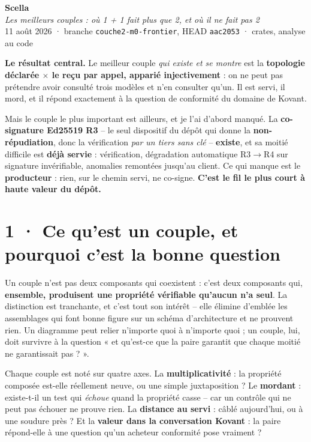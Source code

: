 \documentclass[10pt]{article}
\newcommand{\code}[1]{\texttt{\small #1}}
\newcommand{\x}{$\times$}
\begin{document}
\begin{center}
{\Huge\bfseries\color{navy} Scella}\\[4pt]
{\large\color{grey}\itshape Les meilleurs couples : où 1 + 1 fait plus que 2, et où il ne fait pas 2}\\[4pt]
{\small\color{grey} 11 août 2026 \; · \; branche \code{couche2-m0-frontier}, HEAD \code{aac2053} \; ·  crates, analyse au code}
\end{center}
\vspace{2pt}

\begin{these}
\textbf{Le résultat central.} Le meilleur couple \emph{qui existe et se montre} est la \textbf{topologie
déclarée \x{} le reçu par appel, apparié injectivement} : on ne peut pas prétendre avoir consulté trois
modèles et n'en consulter qu'un. Il est servi, il mord, et il répond exactement à la question de
conformité du domaine de Kovant.

Mais le couple le plus important est ailleurs, et je l'ai d'abord manqué. La \textbf{co-signature
Ed25519 R3} -- le seul dispositif du dépôt qui donne la \textbf{non-répudiation}, donc la vérification
\emph{par un tiers sans clé} -- \textbf{existe}, et sa moitié difficile est \textbf{déjà servie} :
vérification, dégradation automatique R3$\rightarrow$R4 sur signature invérifiable, anomalies
remontées jusqu'au client. Ce qui manque est le \textbf{producteur} : rien, sur le chemin servi, ne
co-signe. \textbf{C'est le fil le plus court à haute valeur du dépôt.}
\end{these}

\section{1 · Ce qu'est un couple, et pourquoi c'est la bonne question}

Un couple n'est pas deux composants qui coexistent : c'est deux composants qui, \textbf{ensemble,
produisent une propriété vérifiable qu'aucun n'a seul}. La distinction est tranchante, et c'est tout
son intérêt -- elle élimine d'emblée les assemblages qui font bonne figure sur un schéma d'architecture
et ne prouvent rien. Un diagramme peut relier n'importe quoi à n'importe quoi ; un couple, lui, doit
survivre à la question « et qu'est-ce que la paire garantit que chaque moitié ne garantissait pas ? ».

Chaque couple est noté sur quatre axes. La \textbf{multiplicativité} : la propriété composée est-elle
réellement neuve, ou une simple juxtaposition ? Le \textbf{mordant} : existe-t-il un test qui
\emph{échoue} quand la propriété casse -- car un contrôle qui ne peut pas échouer ne prouve rien. La
\textbf{distance au servi} : câblé aujourd'hui, ou à une soudure près ? Et la \textbf{valeur dans la
conversation Kovant} : la paire répond-elle à une question qu'un acheteur conformité pose vraiment ?
\end{document}
